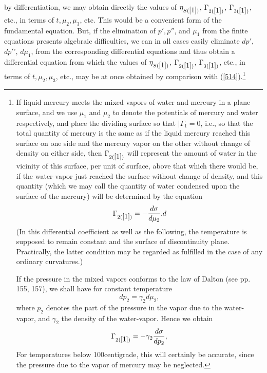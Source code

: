 \documentclass[12pt]{article}
\begin{document}
{by differentiation, we may obtain directly the values of $\eta_{S(\ref{1})}$, $\Gamma_{2(\ref{1})}$, $\Gamma_{3(\ref{1})}$, etc., in terms of $t, \mu_2,\mu_3$, etc. This would be a convenient form of the fundamental equation. But, if the elimination of $p', p''$, and $\mu_1$ from the finite equations presents algebraic difficulties, we can in all cases easily eliminate $dp'$, $dp'$', $d\mu_1$, from the corresponding differential equations and thus obtain a differential equation        from which the values of $\eta_{S(\ref{1})}$, $\Gamma_{2(\ref{1})}$, $\Gamma_{3(\ref{1})}$, etc., in terms of $t, \mu_2,\mu_3$, etc., may be at once obtained by comparison with (\ref{514}).\footnote{If liquid mercury meets the mixed vapors of water and mercury in a plane surface, and we use $\mu_1$ and $\mu_2$ to denote the potentials of mercury and water respectively, and place the dividing surface so that $|\Gamma_1=0$, i.e., so that the total quantity of mercury is the same as if the liquid mercury reached this surface on one side and the mercury vapor on the other without change of density on either side, then $\Gamma_{2(\ref{1})}$ will represent the amount of water in the vicinity of this surface, per unit of surface, above that which there would be, if the water-vapor just reached the surface without change of density, and this quantity (which we may call the quantity of water condensed upon the surface of the mercury) will be determined by the equation
$$ \Gamma_{2(\ref{1})} = -\frac{d\sigma}{d\mu_2}.                d$$
(In this differential coefficient as well as the following, the temperature is supposed to remain constant and the surface of discontinuity plane. Practically, the latter condition may be regarded as fulfilled in the case of any ordinary curvatures.)\par
If the pressure in the mixed vapors conforms to the law of Dalton (see pp. 155, 157), we shall have for constant temperature
$$ dp_2= \gamma_2 d\mu_2,$$
where $p_2$ denotes the part of the pressure in the vapor due to the water-vapor, and $\gamma_2 $ the density of the water-vapor. Hence we obtain
$$ \Gamma_{2(\ref{1})} = - \gamma_2 \frac{d\sigma}{dp_2},$$
For temperatures below 100\degree  centigrade, this will certainly be accurate, since the pressure due to the vapor of mercury may be neglected.\par
}}
\end{document}
